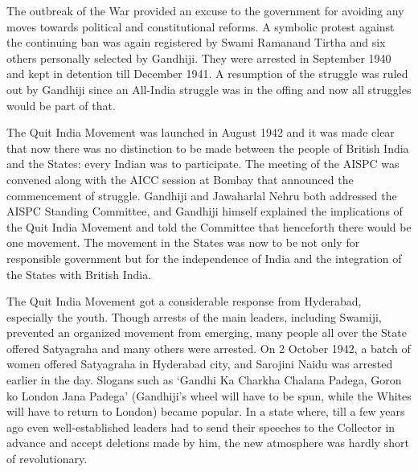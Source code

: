 The outbreak of the War provided an excuse to the government for avoiding any moves towards political and constitutional reforms. A symbolic protest against the continuing ban was again registered by Swami Ramanand Tirtha and six others personally selected by Gandhiji. They were arrested in September 1940 and kept in detention till December 1941. A resumption of the struggle was ruled out by Gandhiji since an All-India struggle was in the offing and now all struggles would be part of that. 

The Quit India Movement was launched in August 1942 and it was made clear that now there was no distinction to be made between the people of British India and the States: every Indian was to participate. The meeting of the AISPC was convened along with the AICC session at Bombay that announced the commencement of struggle. Gandhiji and Jawaharlal Nehru both addressed the AISPC Standing Committee, and Gandhiji himself explained the implications of the Quit India Movement and told the Committee that henceforth there would be one movement. The movement in the States was now to be not only for responsible government but for the independence of India and the integration of the States with British India. 

The Quit India Movement got a considerable response from Hyderabad, especially the youth. Though arrests of the main leaders, including Swamiji, prevented an organized movement from emerging, many people all over the State offered Satyagraha and many others were arrested. On 2 October 1942, a batch of women offered Satyagraha in Hyderabad city, and Sarojini Naidu was arrested earlier in the day. Slogans such as `Gandhi Ka Charkha Chalana Padega, Goron ko London Jana Padega' (Gandhiji's wheel will have to be spun, while the Whites will have to return to London) became popular. In a state where, till a few years ago even well-established leaders had to send their speeches to the Collector in advance and accept deletions made by him, the new atmosphere was hardly short of revolutionary. 

